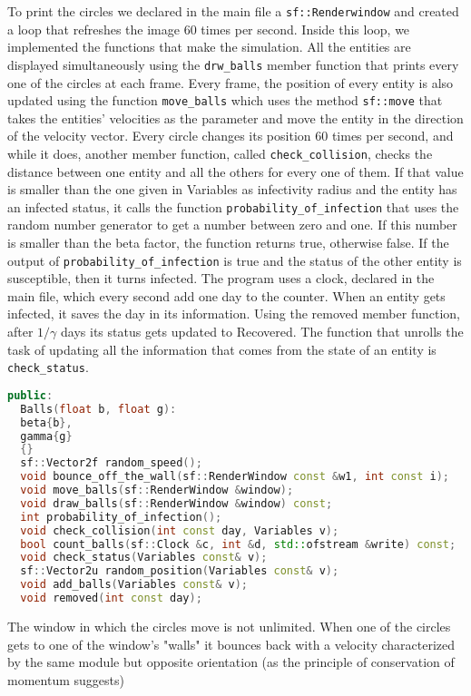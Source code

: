 \documentclass[a4paper, 11pt]{article}
\begin{document}
  To print the circles we declared in the main file a \verb|sf::Renderwindow| and created a loop that refreshes the image 60 times per second. Inside this loop, we implemented the functions that make the simulation. All the entities are displayed simultaneously using the \verb|drw_balls| member function that prints every one of the circles at each frame.
  Every frame, the position of every entity is also updated using the function \verb|move_balls| which uses the method \verb|sf::move| that takes the entities' velocities as the parameter and move the entity in the direction of the velocity vector. Every circle changes its position 60 times per second, and while it does, another member function, called \verb|check_collision|, checks the distance between one entity and all the others for every one of them. If that value is smaller than the one given in Variables as infectivity radius and the entity has an infected status, it calls the function \verb|probability_of_infection| that uses the random number generator to get a number between zero and one. If this number is smaller than the beta factor, the function returns true, otherwise false. If the output of \verb|probability_of_infection| is true and the status of the other entity is susceptible, then it turns infected. The program uses a clock, declared in the main file, which every second add one day to the counter. When an entity gets infected, it saves the day in its information. Using the removed member function, after $1/\gamma$ days its status gets updated to Recovered. The function that unrolls the task of updating all the information that comes from the state of an entity is \verb|check_status|.
  \begin{lstlisting}[language=C++, style=code]
public:
  Balls(float b, float g):
  beta{b},
  gamma{g}
  {}
  sf::Vector2f random_speed();
  void bounce_off_the_wall(sf::RenderWindow const &w1, int const i);
  void move_balls(sf::RenderWindow &window);
  void draw_balls(sf::RenderWindow &window) const;
  int probability_of_infection();
  void check_collision(int const day, Variables v);
  bool count_balls(sf::Clock &c, int &d, std::ofstream &write) const;
  void check_status(Variables const& v);
  sf::Vector2u random_position(Variables const& v);
  void add_balls(Variables const& v);
  void removed(int const day);
  \end{lstlisting}
  The window in which the circles move is not unlimited. When one of the circles gets to one of the window's "walls" it bounces back with a velocity characterized by the same module but opposite orientation (as the principle of conservation of momentum suggests)
\end{document}
